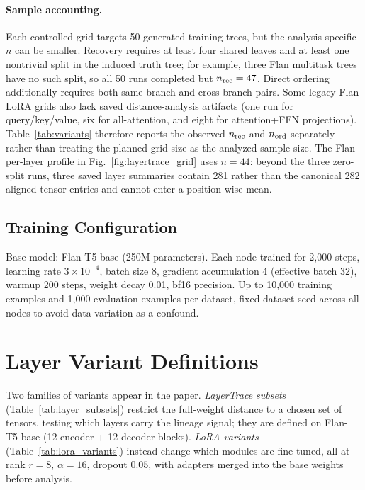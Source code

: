\documentclass{article}
\theoremstyle{definition}
\theoremstyle{plain}
\begin{document}
\paragraph{Sample accounting.} Each controlled grid targets 50 generated training trees, but the
analysis-specific $n$ can be smaller. Recovery requires at least four shared leaves and at least one
nontrivial split in the induced truth tree; for example, three Flan multitask trees have no such split,
so all 50 runs completed but $n_{\rm rec}=47$. Direct ordering additionally requires both same-branch
and cross-branch pairs. Some legacy Flan LoRA grids also lack saved distance-analysis artifacts
(one run for query/key/value, six for all-attention, and eight for attention+FFN projections).
Table~\ref{tab:variants} therefore reports the observed $n_{\rm rec}$ and $n_{\rm ord}$ separately rather
than treating the planned grid size as the analyzed sample size. The Flan per-layer profile in
Fig.~\ref{fig:layertrace_grid} uses $n=44$: beyond the three zero-split runs, three saved layer summaries
contain 281 rather than the canonical 282 aligned tensor entries and cannot enter a position-wise mean.

\subsection*{Training Configuration}
Base model: Flan-T5-base (250M parameters). Each node trained for 2,000 steps, learning rate $3 \times 10^{-4}$, batch size 8, gradient accumulation 4 (effective batch 32), warmup 200 steps, weight decay 0.01, bf16 precision. Up to 10,000 training examples and 1,000 evaluation examples per dataset, fixed dataset seed across all nodes to avoid data variation as a confound.

\section{Layer Variant Definitions}
\label{app:layers}
Two families of variants appear in the paper. \emph{LayerTrace subsets} (Table~\ref{tab:layer_subsets})
restrict the full-weight distance to a chosen set of tensors, testing which layers carry the lineage
signal; they are defined on Flan-T5-base (12 encoder + 12 decoder blocks). \emph{LoRA variants}
(Table~\ref{tab:lora_variants}) instead change which modules are fine-tuned, all at rank $r=8$,
$\alpha=16$, dropout $0.05$, with adapters merged into the base weights before analysis.
\end{document}
